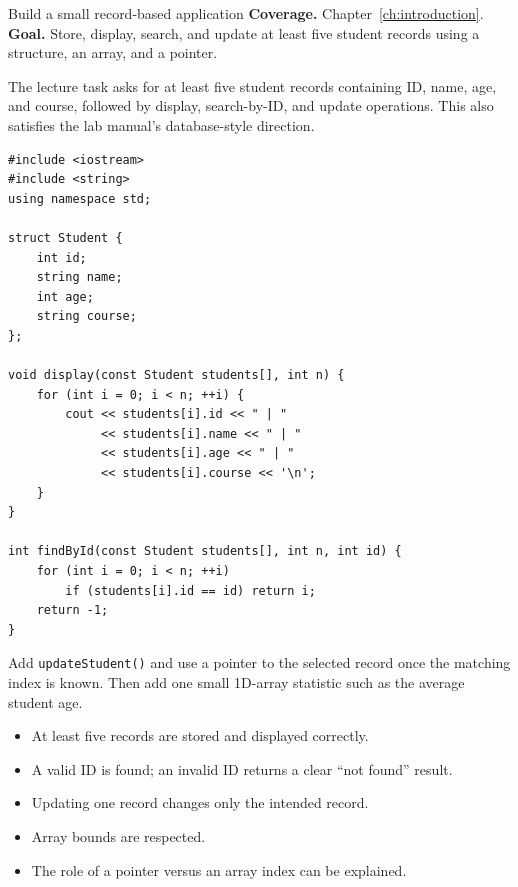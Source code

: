 \begin{labproject}{Build a small record-based application}
\textbf{Coverage.} Chapter~\ref{ch:introduction}.\\
\textbf{Goal.} Store, display, search, and update at least five student records using a structure, an array, and a pointer.

The lecture task asks for at least five student records containing ID, name, age, and course, followed by display, search-by-ID, and update operations. This also satisfies the lab manual's database-style direction.

\begin{lstlisting}
#include <iostream>
#include <string>
using namespace std;

struct Student {
    int id;
    string name;
    int age;
    string course;
};

void display(const Student students[], int n) {
    for (int i = 0; i < n; ++i) {
        cout << students[i].id << " | "
             << students[i].name << " | "
             << students[i].age << " | "
             << students[i].course << '\n';
    }
}

int findById(const Student students[], int n, int id) {
    for (int i = 0; i < n; ++i)
        if (students[i].id == id) return i;
    return -1;
}
\end{lstlisting}

\begin{tryit}
Add \texttt{updateStudent()} and use a pointer to the selected record once the matching index is known. Then add one small 1D-array statistic such as the average student age.
\end{tryit}

\begin{verification}
\begin{itemize}
  \item At least five records are stored and displayed correctly.
  \item A valid ID is found; an invalid ID returns a clear ``not found'' result.
  \item Updating one record changes only the intended record.
  \item Array bounds are respected.
  \item The role of a pointer versus an array index can be explained.
\end{itemize}
\end{verification}

\end{labproject}

